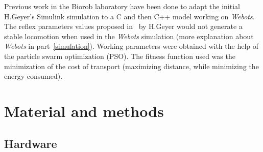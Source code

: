 \documentclass[a4paper,12pt]{article}
\begin{document}
Previous work in the Biorob laboratory have been done to adapt the initial H.Geyer's Simulink simulation to a C and then C++ model working on \textit{Webots}. The reflex parameters values proposed in~\cite{geyer2010muscle} by H.Geyer would not generate a stable locomotion when used in the \textit{Webots} simulation (more explanation about \textit{Webots} in part~\ref{simulation}). Working parameters were obtained with the help of the particle swarm optimization (PSO). The fitness function used was the minimization of the cost of transport (maximizing distance, while minimizing the energy consumed).


\newpage*
\section{Material and methods}

\subsection{Hardware}\label{hardware}
\end{document}
